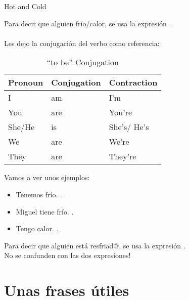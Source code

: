 \begin{conf}{Hot and Cold}

Para decir que alguien  fr\'io/calor, se usa la
expresi\'on .\\ \\

Les dejo la conjugaci\'on del verbo  como referencia:\\

\begin{table}[H]
	\centering
	\begin{tabular}{lll}
	\toprule
		\textbf{Pronoun} & \textbf{Conjugation} & \textbf{Contraction}\\
	\midrule
		I & am & I'm\\
		You & are & You're \\
		She/He & is & She's/ He's\\
		We & are & We're \\
		They & are & They're \\
	\bottomrule
	\end{tabular}
	\caption{``to be'' Conjugation}
\end{table}

Vamos a ver unos ejemplos:
	\begin{itemize}
		\item Tenemos fr\'io. \arr {}.
		\item Miguel tiene fr\'io. \arr {}.
		\item Tengo calor. \arr {}.
	\end{itemize}

Para decir que alguien est\'a resfriad@, se usa la expresi\'on
.\\

\textexclamdown No se confunden con las dos expresiones!
\end{conf}

\section{Unas frases \'utiles}

